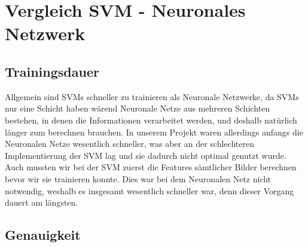 \section{Vergleich SVM - Neuronales Netzwerk}

\subsection{Trainingsdauer}

Allgemein sind SVMs schneller zu trainieren als Neuronale Netzwerke, da SVMs nur eine Schicht haben wärend Neuronale Netze aus mehreren Schichten bestehen, in denen die Informationen verarbeitet werden, und deshalb natürlich länger zum berechnen brauchen. In unserem Projekt waren allerdings anfangs die Neuronalen Netze wesentlich schneller, was aber an der schlechteren Implementierung der SVM lag und sie dadurch nicht optimal genutzt wurde. Auch mussten wir bei der SVM zuerst die Features sämtlicher Bilder berechnen bevor wir sie trainieren konnte. Dies war bei dem Neuronalen Netz nicht notwendig, weshalb es insgesamt wesentlich schneller war, denn dieser Vorgang dauert am längsten.

\subsection{Genauigkeit}